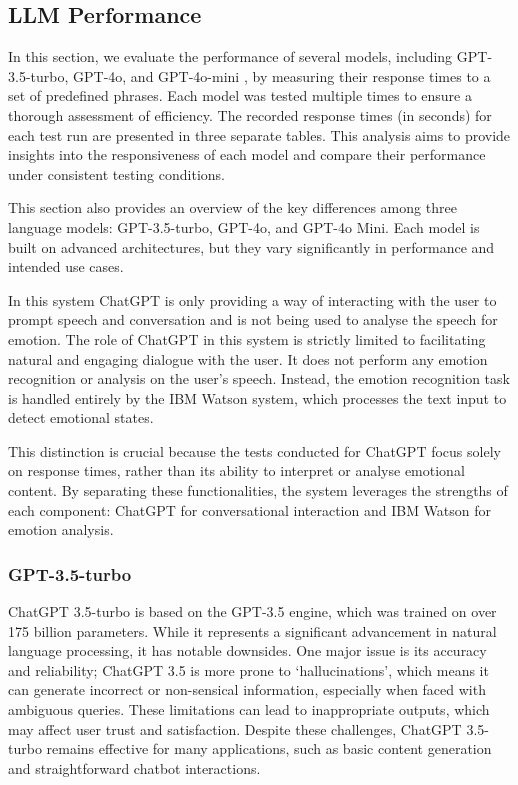 \subsection{LLM Performance}

In this section, we evaluate the performance of several models, including GPT-3.5-turbo, GPT-4o, and GPT-4o-mini \cite{openai2024}, by measuring their response times to a set of predefined phrases. Each model was tested multiple times to ensure a thorough assessment of efficiency. The recorded response times (in seconds) for each test run are presented in three separate tables. This analysis aims to provide insights into the responsiveness of each model and compare their performance under consistent testing conditions.

This section also provides an overview of the key differences among three language models: GPT-3.5-turbo, GPT-4o, and GPT-4o Mini. Each model is built on advanced architectures, but they vary significantly in performance and intended use cases.

In this system ChatGPT is only providing a way of interacting with the user to prompt speech and conversation and is not being used to analyse the speech for emotion. The role of ChatGPT in this system is strictly limited to facilitating natural and engaging dialogue with the user. It does not perform any emotion recognition or analysis on the user's speech. Instead, the emotion recognition task is handled entirely by the IBM Watson system, which processes the text input to detect emotional states.

This distinction is crucial because the tests conducted for ChatGPT focus solely on response times, rather than its ability to interpret or analyse emotional content. By separating these functionalities, the system leverages the strengths of each component: ChatGPT for conversational interaction and IBM Watson for emotion analysis.

\subsubsection{GPT-3.5-turbo}

ChatGPT 3.5-turbo is based on the GPT-3.5 engine, which was trained on over 175 billion parameters. While it represents a significant advancement in natural language processing, it has notable downsides. One major issue is its accuracy and reliability; ChatGPT 3.5 is more prone to `hallucinations', which means it can generate incorrect or non-sensical information, especially when faced with ambiguous queries. These limitations can lead to inappropriate outputs, which may affect user trust and satisfaction. Despite these challenges, ChatGPT 3.5-turbo remains effective for many applications, such as basic content generation and straightforward chatbot interactions.

